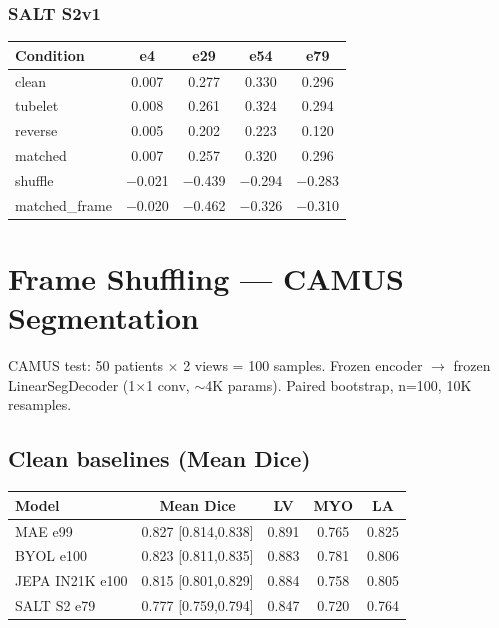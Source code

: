 \documentclass{article}
\begin{document}
\subsubsection{SALT S2v1}
\begin{center}
\begin{tabular}{lcccc}
\toprule
Condition & e4 & e29 & e54 & e79 \\
\midrule
clean     & 0.007 & 0.277 & 0.330 & 0.296 \\
tubelet   & 0.008 & 0.261 & 0.324 & 0.294 \\
reverse   & 0.005 & 0.202 & 0.223 & 0.120 \\
matched   & 0.007 & 0.257 & 0.320 & 0.296 \\
shuffle   & $-$0.021 & $-$0.439 & $-$0.294 & $-$0.283 \\
matched\_frame & $-$0.020 & $-$0.462 & $-$0.326 & $-$0.310 \\
\bottomrule
\end{tabular}
\end{center}

\section{Frame Shuffling --- CAMUS Segmentation}\label{sec:camus_shuf}

CAMUS test: 50 patients $\times$ 2 views = 100 samples. Frozen encoder $\to$ frozen LinearSegDecoder (1$\times$1 conv, $\sim$4K params). Paired bootstrap, n=100, 10K resamples.

\subsection{Clean baselines (Mean Dice)}

\begin{center}
\begin{tabular}{lcccc}
\toprule
Model & Mean Dice & LV & MYO & LA \\
\midrule
MAE e99        & 0.827 [0.814,0.838] & 0.891 & 0.765 & 0.825 \\
BYOL e100      & 0.823 [0.811,0.835] & 0.883 & 0.781 & 0.806 \\
JEPA IN21K e100 & 0.815 [0.801,0.829] & 0.884 & 0.758 & 0.805 \\
SALT S2 e79    & 0.777 [0.759,0.794] & 0.847 & 0.720 & 0.764 \\
\bottomrule
\end{tabular}
\end{center}
\end{document}
